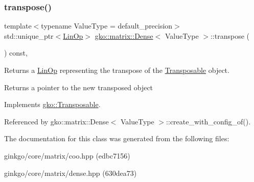\subsubsection{\texorpdfstring{transpose()}{transpose()}}
{\footnotesize\ttfamily template$<$typename Value\+Type = default\+\_\+precision$>$ \\
std\+::unique\+\_\+ptr$<$\hyperlink{classgko_1_1LinOp}{Lin\+Op}$>$ \hyperlink{classgko_1_1matrix_1_1Dense}{gko\+::matrix\+::\+Dense}$<$ Value\+Type $>$\+::transpose (\begin{DoxyParamCaption}{ }\end{DoxyParamCaption}) const\hspace{0.3cm}{\ttfamily [override]}, {\ttfamily [virtual]}}



Returns a \hyperlink{classgko_1_1LinOp}{Lin\+Op} representing the transpose of the \hyperlink{classgko_1_1Transposable}{Transposable} object. 

\begin{DoxyReturn}{Returns}
a pointer to the new transposed object 
\end{DoxyReturn}


Implements \hyperlink{classgko_1_1Transposable_a5c6b778b71b47d53e0bda6ccf894d318}{gko\+::\+Transposable}.



Referenced by gko\+::matrix\+::\+Dense$<$ Value\+Type $>$\+::create\+\_\+with\+\_\+config\+\_\+of().



The documentation for this class was generated from the following files\+:\begin{DoxyCompactItemize}
\item 
ginkgo/core/matrix/coo.\+hpp (edbc7156)\item 
ginkgo/core/matrix/dense.\+hpp (630dea73)\end{DoxyCompactItemize}
